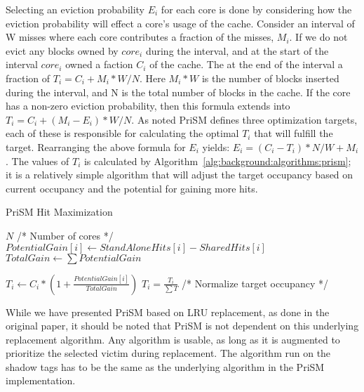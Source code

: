 Selecting an eviction probability $E_i$ for each core is done by considering how the eviction probability will effect a core's usage of the cache.
Consider an interval of W misses where each core contributes a fraction of the misses, $M_i$.
If we do not evict any blocks owned by $core_i$ during the interval, and at the start of the interval $core_i$ owned a faction $C_i$ of the cache.
The at the end of the interval a fraction of $T_i = C_i + M_i * W/N$. 
Here $M_i * W$ is the number of blocks inserted during the interval, and N is the total number of blocks in the cache.
If the core has a non-zero eviction probability, then this formula extends into $T_i = C_i + (M_i - E_i) * W/N$.
As noted PriSM defines three optimization targets, each of these is responsible for calculating the optimal $T_i$ that will fulfill the target.
Rearranging the above formula for $E_i$ yields: $E_i = (C_i - T_i) * N/W + M_i$.
The values of $T_i$ is calculated by Algorithm~\ref{alg:background:algorithms:prism}; it is a relatively simple algorithm that will adjust the target occupancy based on current occupancy and the potential for gaining more hits.

\begin{algorithm}[ht]
\caption{PriSM Hit Maximization}
\label{alg:background:algorithms:prism}
\begin{algorithmic}[1]
\State $N$ /* Number of cores */
	\State $PotentialGain[i]\gets StandAloneHits[i] - SharedHits[i]$
\EndFor
\State $TotalGain\gets \sum{PotentialGain}$

	\State $T_i\gets C_i * (1 + \frac{PotentialGain[i]}{TotalGain})$
\EndFor
\State $T_i = \frac{T_i}{\sum{T}}$ /* Normalize target occupancy */
\end{algorithmic}
\end{algorithm}

While we have presented PriSM based on LRU replacement, as done in the original paper, it should be noted that PriSM is not dependent on this underlying replacement algorithm.
Any algorithm is usable, as long as it is augmented to prioritize the selected victim during replacement.
The algorithm run on the shadow tags has to be the same as the underlying algorithm in the PriSM implementation.

